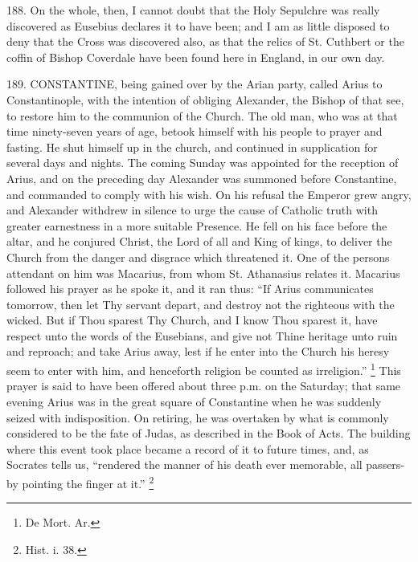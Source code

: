 188.
On the whole, then, I cannot doubt that the Holy Sepulchre was really
discovered as Eusebius declares it to have been; and I am as little
disposed to deny that the Cross was discovered also, as that the
relics of St. Cuthbert or the coffin of Bishop Coverdale have been
found here in England, in our own day.


189.
CONSTANTINE, being gained over
by the Arian party, called Arius to Constantinople, with the intention
of obliging Alexander, the Bishop of that see, to restore him to the
communion of the Church. The old man, who was at that time
ninety-seven years of age, betook himself with his people to prayer
and fasting. He shut himself up in the church, and continued in
supplication for several days and nights. The coming Sunday was
appointed for the reception of Arius, and on the preceding day
Alexander was summoned before Constantine, and commanded to comply
with his wish. On his refusal the Emperor grew angry, and Alexander
withdrew in silence to urge the cause of Catholic truth with greater
earnestness in a more suitable Presence. He fell on his face before
the altar, and he conjured Christ, the Lord of all and King of kings,
to deliver the Church from the danger and disgrace which threatened
it. One of the persons attendant on him was Macarius, from whom St.
Athanasius relates it. Macarius followed his prayer as he spoke
it, and it ran thus: ``If Arius communicates tomorrow, then let
Thy servant depart, and destroy not the righteous with the wicked. But
if Thou sparest Thy Church, and I know Thou sparest it, have respect
unto the words of the Eusebians, and give not Thine heritage unto ruin
and reproach; and take Arius away, lest if he enter into the Church
his heresy seem to enter with him, and henceforth religion be counted
as irreligion.'' \footnote{De Mort. Ar.} This
prayer is said to have been offered about three p.m. on the Saturday;
that same evening Arius was in the great square of Constantine when he
was suddenly seized with indisposition. On retiring, he was overtaken
by what is commonly considered to be the fate of Judas, as described
in the Book of Acts. The building where this event took place became a
record of it to future times, and, as Socrates tells us,
``rendered the manner of his death ever memorable, all passers-by
pointing the finger at it.'' \footnote{Hist. i. 38.}

